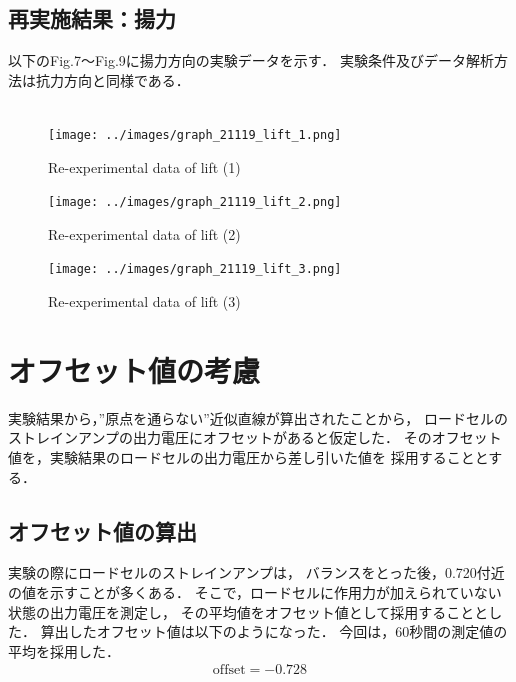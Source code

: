 \documentclass[twocolumn,a4j]{jsarticle}
\begin{document}
\newpage

\subsection{再実施結果：揚力}
以下のFig.7～Fig.9に揚力方向の実験データを示す．
実験条件及びデータ解析方法は抗力方向と同様である．\\ \\
\begin{figure}[htbp]
    \footnotesize
    \begin{center}
        \texttt{[image: ../images/graph\_21119\_lift\_1.png]}
        \caption{Re-experimental data of lift (1)}
        \texttt{[image: ../images/graph\_21119\_lift\_2.png]}
        \caption{Re-experimental data of lift (2)}
        \texttt{[image: ../images/graph\_21119\_lift\_3.png]}
        \caption{Re-experimental data of lift (3)}
    \end{center}
\end{figure}

\newpage


\section{オフセット値の考慮}
実験結果から，”原点を通らない”近似直線が算出されたことから，
ロードセルのストレインアンプの出力電圧にオフセットがあると仮定した．
そのオフセット値を，実験結果のロードセルの出力電圧から差し引いた値を
採用することとする．

\subsection{オフセット値の算出}
実験の際にロードセルのストレインアンプは，
バランスをとった後，0.720付近の値を示すことが多くある．
そこで，ロードセルに作用力が加えられていない状態の出力電圧を測定し，
その平均値をオフセット値として採用することとした．
算出したオフセット値は以下のようになった．
今回は，60秒間の測定値の平均を採用した．
\begin{eqnarray*}
    \mathrm{offset} = -0.728
\end{eqnarray*}
\end{document}
